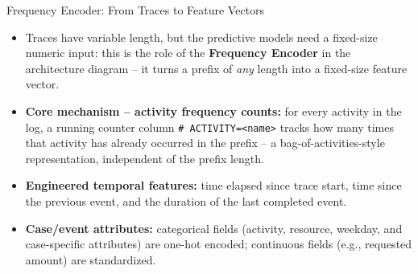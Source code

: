 \documentclass[aspectratio=169]{beamer} %
\begin{document}
\begin{frame}{Frequency Encoder: From Traces to Feature Vectors}
    \begin{itemize}
        \item Traces have variable length, but the predictive models need a fixed-size numeric input: this is the role of the \textbf{Frequency Encoder} in the architecture diagram -- it turns a prefix of \emph{any} length into a fixed-size feature vector.
        \item \textbf{Core mechanism -- activity frequency counts:} for every activity in the log, a running counter column \texttt{\# ACTIVITY=<name>} tracks how many times that activity has already occurred in the prefix -- a bag-of-activities-style representation, independent of the prefix length.
        \item \textbf{Engineered temporal features:} time elapsed since trace start, time since the previous event, and the duration of the last completed event.
        \item \textbf{Case/event attributes:} categorical fields (activity, resource, weekday, and case-specific attributes) are one-hot encoded; continuous fields (e.g., requested amount) are standardized.
    \end{itemize}
\end{frame}
\end{document}
